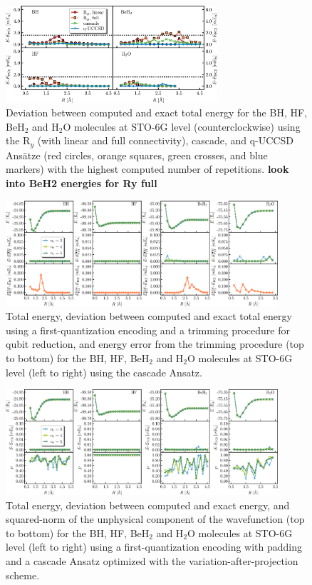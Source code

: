 \documentclass[aps,pra,onecolumn]{revtex4-2}
\newcommand{\todo}[1]{{\bf{{\color{red}#1}}}}
\begin{document}
\begin{figure}[t!]
\includegraphics[width=0.7\textwidth]{../figures/second_quantization_comparison/second_quantization_comparison.eps}
\caption{Deviation between computed and exact total energy for the BH, HF, BeH$_2$ and H$_2$O molecules at STO-6G level 
(counterclockwise) using the R$_y$ (with linear and full connectivity), cascade, and q-UCCSD Ans\"{a}tze 
(red circles, orange squares, green crosses, and blue markers) with the highest computed number of repetitions.
\todo{look into BeH2 energies for Ry full}
}
\label{figure:second_h2o}
\end{figure} 

\begin{figure}[t!]
\includegraphics[width=0.9\textwidth]{../figures/first_quantization_trim/first_quantization_trim.eps}
\caption{Total energy, deviation between computed and exact total energy using a first-quantization encoding and a trimming procedure for qubit reduction,
and energy error from the trimming procedure (top to bottom) for the BH, HF, BeH$_2$ and H$_2$O molecules at STO-6G level (left to right) 
using the cascade Ansatz.}
\label{figure:first_trim}
\end{figure} 

\begin{figure}[t!]
\includegraphics[width=0.9\textwidth]{../figures/first_quantization_pad_vap_cascade/first_quantization_pad_vap_cascade.eps}
\caption{Total energy, deviation between computed and exact energy, and squared-norm of the unphysical component of the wavefunction
(top to bottom) for the BH, HF, BeH$_2$ and H$_2$O molecules at STO-6G level (left to right) 
using a first-quantization encoding with padding and a cascade Ansatz optimized with the variation-after-projection scheme.}
\label{figure:first_pad_vap_cascade}
\end{figure} 
\end{document}
